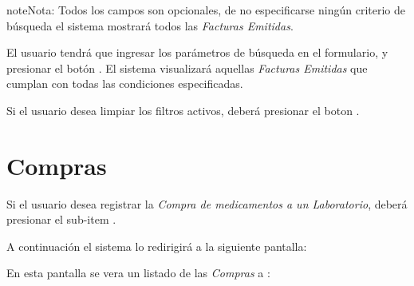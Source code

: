 \documentclass[a4paper,10pt,spanish]{sphinxmanual}
\begin{document}
\begin{notice}{note}{Nota:}
Todos los campos son opcionales, de no especificarse ningún criterio de búsqueda el sistema mostrará todos las \emph{Facturas Emitidas}.
\end{notice}

El usuario tendrá que ingresar los parámetros de búsqueda en el formulario, y presionar el botón . El sistema visualizará aquellas \emph{Facturas Emitidas} que cumplan con todas las condiciones especificadas.

Si el usuario desea limpiar los filtros activos, deberá presionar el boton .



\section{Compras}
\label{compras::doc}\label{compras:compras}
Si el usuario desea registrar la \emph{Compra de medicamentos a un Laboratorio}, deberá presionar el sub-item .


A continuación el sistema lo redirigirá a la siguiente pantalla:


En esta pantalla se vera un listado de las \emph{Compras} a :

\end{document}
